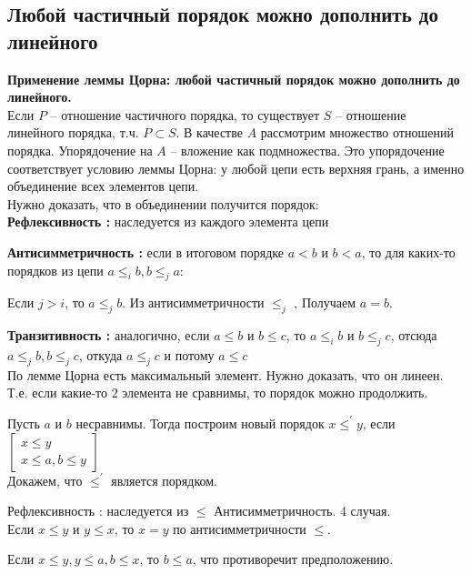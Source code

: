 \subsection{Любой частичный порядок можно дополнить до линейного}

\textbf{Применение леммы Цорна: любой частичный порядок можно дополнить до линейного.}\\

Если $P$ -- отношение частичного порядка, то существует $S$ -- отношение линейного порядка, т.ч. $P \subset S$. 
В качестве $A$ рассмотрим множество отношений порядка. Упорядочение на $A$ -- вложение как подмножества. 
Это упорядочение соответствует условию леммы Цорна: у любой цепи есть верхняя грань, а именно объединение всех элементов цепи.\\

Нужно доказать, что в объединении получится порядок: \\

\textbf{Рефлексивность :} наследуется из каждого элемента цепи 

\textbf{Антисимметричность :} если в итоговом порядке $a < b$ и $b < a$, то для каких-то порядков из цепи $a \leq_i b, b \leq_j a$:

Если $j > i$, то $a \leq_j b$. Из антисимметричности $\leq_j$ ‚ Получаем $a = b$. 

\textbf{Транзитивность :} аналогично, если $a \leq b$ и $b \leq c$, то $a \leq_i b$ и $b \leq_j c$, отсюда $a \leq_j b, b \leq_j c$, откуда $a \leq_j c$ и потому $a \leq c$\\

По лемме Цорна есть максимальный элемент. Нужно доказать, что он линеен. 
Т.е. если какие-то $2$ элемента не сравнимы, то порядок можно продолжить. 

Пусть $a$ и $b$ несравнимы. 
Тогда построим новый порядок $x \leq^{'} y$, если $\begin{bmatrix}
    x \leq y \\
    x \leq a, b \leq y
\end{bmatrix}$\\

Докажем, что $\leq^{'}$ является порядком. 

Рефлексивность : наследуется из $\leq$ 
Антисимметричность. 4 случая.\\

Если $x \leq y$ и $y \leq x$, то $x = y$ по антисимметричности $\leq$.

Если $x \leq y, y \leq a, b \leq x$, то $b \leq a$, что противоречит предположению.

